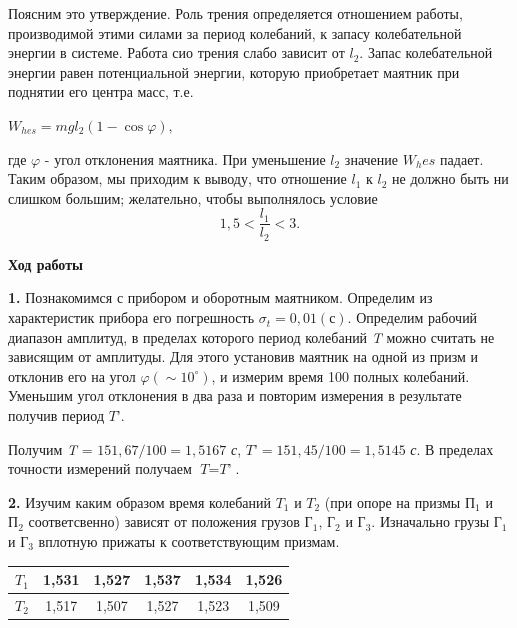 \documentclass[12pt,a4paper]{article}
\begin{document}
Поясним это утверждение. Роль трения определяется отношением работы, производимой этими силами за период колебаний, к запасу колебательной энергии в системе. Работа сио трения слабо зависит от $l_2$. Запас колебательной энергии равен потенциальной энергии, которую приобретает маятник при поднятии его центра масс, т.е.

\begin{center}
    $W_{hes} = mgl_2(1-\cos\varphi),$
\end{center}

где $\varphi$ - угол отклонения маятника. При уменьшение $l_2$ значение $W_hes$ падает. Таким образом, мы приходим к выводу, что отношение $l_1$ к $l_2$ не должно быть ни слишком большим; желательно, чтобы выполнялось условие
\begin{equation}\label{14}
    1,5<\frac{l_1}{l_2}<3.
\end{equation}

\vspace{1cm}

\large\textbf{Ход работы}

\vspace{1cm}

\textbf{1.} Познакомимся с прибором и оборотным маятником. Определим из характеристик прибора его погрешность $\sigma_t = 0,01 (\textit{с})$.
Определим рабочий диапазон амплитуд, в пределах которого период колебаний \textit{T} можно считать не зависящим от амплитуды. Для этого установив маятник на одной из призм и отклонив его на угол $\varphi (\sim 10^{\circ})$, и измерим время 100 полных колебаний. Уменьшим угол отклонения в два раза и повторим измерения в результате получив период $\textit{T'}$.

Получим \textit{T} = $151,67  / 100 = 1,5167$ \textit{с}, $\textit{T'} = 151,45 / 100 = 1,5145$ \textit{с}. В пределах точности измерений получаем $\textit{T} = \textit{T'}$.

\vspace{0,5cm}

\textbf{2.} Изучим каким образом время колебаний $\textit{T}_1$ и $\textit{T}_2$ (при опоре на призмы $\textit{П}_1$ и $\textit{П}_2$ соответсвенно) зависят от положения грузов $\textit{Г}_1$, $\textit{Г}_2$ и $\textit{Г}_3$. Изначально грузы $\textit{Г}_1$ и $\textit{Г}_3$ вплотную прижаты к соответствующим призмам.

\vspace{0,5cm}

\begin{center}
\begin{tabular}{|c|c|c|c|c|c|}
\hline 
$\textit{T}_1$ & 1,531 & 1,527 & 1,537 & 1,534 & 1,526 \\ 
\hline 
$\textit{T}_2$ & 1,517 & 1,507 & 1,527 & 1,523 & 1,509 \\ 
\hline 
\end{tabular} 
\end{center}
\end{document}

